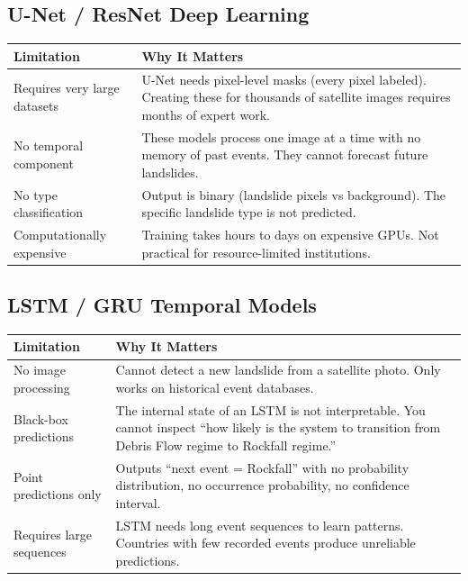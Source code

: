\documentclass[11pt]{article}
\begin{document}
\subsection{U-Net / ResNet Deep Learning}
\begin{table}[H]
\centering
\begin{tabular}{@{}p{5.5cm}p{7.5cm}@{}}
\toprule
\textbf{Limitation} & \textbf{Why It Matters} \\
\midrule
Requires very large datasets & U-Net needs pixel-level masks (every pixel labeled). Creating these for thousands of satellite images requires months of expert work. \\
No temporal component & These models process one image at a time with no memory of past events. They cannot forecast future landslides. \\
No type classification & Output is binary (landslide pixels vs background). The specific landslide type is not predicted. \\
Computationally expensive & Training takes hours to days on expensive GPUs. Not practical for resource-limited institutions. \\
\bottomrule
\end{tabular}
\end{table}

\subsection{LSTM / GRU Temporal Models}
\begin{table}[H]
\centering
\begin{tabular}{@{}p{5.5cm}p{7.5cm}@{}}
\toprule
\textbf{Limitation} & \textbf{Why It Matters} \\
\midrule
No image processing & Cannot detect a new landslide from a satellite photo. Only works on historical event databases. \\
Black-box predictions & The internal state of an LSTM is not interpretable. You cannot inspect ``how likely is the system to transition from Debris Flow regime to Rockfall regime.'' \\
Point predictions only & Outputs ``next event = Rockfall'' with no probability distribution, no occurrence probability, no confidence interval. \\
Requires large sequences & LSTM needs long event sequences to learn patterns. Countries with few recorded events produce unreliable predictions. \\
\bottomrule
\end{tabular}
\end{table}
\end{document}
